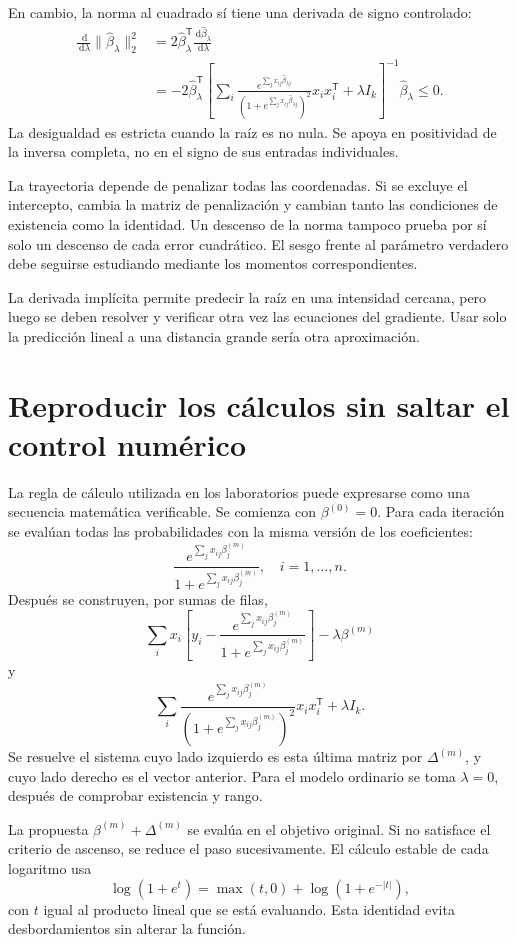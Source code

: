 \documentclass[11pt,a4paper]{article}
\newcommand{\T}{^{\mathsf T}}
\newcommand{\dd}{\,\mathrm d}
\begin{document}
En cambio, la norma al cuadrado sí tiene una
derivada de signo controlado:
\[
\begin{aligned}
\frac{\dd}{\dd\lambda}\|\widehat\beta_\lambda\|_2^2
&=2\widehat\beta_\lambda\T
\frac{\dd\widehat\beta_\lambda}{\dd\lambda}\\
&=-2\widehat\beta_\lambda\T
\left[
\sum_i\frac{e^{\sum_jx_{ij}\widehat\beta_{\lambda j}}}
{(1+e^{\sum_jx_{ij}\widehat\beta_{\lambda j}})^2}
x_ix_i\T+\lambda I_k
\right]^{-1}\widehat\beta_\lambda\le0.
\end{aligned}
\]
La desigualdad es estricta cuando la raíz es no nula.
Se apoya en positividad de la inversa completa,
no en el signo de sus entradas individuales.

La trayectoria depende de penalizar todas las coordenadas.
Si se excluye el intercepto, cambia la matriz de penalización
y cambian tanto las condiciones de existencia como la identidad.
Un descenso de la norma tampoco prueba por sí solo
un descenso de cada error cuadrático.
El sesgo frente al parámetro verdadero debe
seguirse estudiando mediante los momentos correspondientes.

La derivada implícita permite predecir la raíz en una
intensidad cercana, pero luego se deben resolver y
verificar otra vez las ecuaciones del gradiente.
Usar solo la predicción lineal a una distancia grande
sería otra aproximación.

\clearpage
\section{Reproducir los cálculos sin saltar el control numérico}\label{logit149}
La regla de cálculo utilizada en los laboratorios
puede expresarse como una secuencia matemática verificable.
Se comienza con \(\beta^{(0)}=0\).
Para cada iteración se evalúan todas las probabilidades
con la misma versión de los coeficientes:
\[
\frac{e^{\sum_jx_{ij}\beta_j^{(m)}}}
{1+e^{\sum_jx_{ij}\beta_j^{(m)}}},\quad i=1,\ldots,n.
\]
Después se construyen, por sumas de filas,
\[
\sum_i x_i\left[y_i-
\frac{e^{\sum_jx_{ij}\beta_j^{(m)}}}
{1+e^{\sum_jx_{ij}\beta_j^{(m)}}}\right]-\lambda\beta^{(m)}
\]
y
\[
\sum_i\frac{e^{\sum_jx_{ij}\beta_j^{(m)}}}
{(1+e^{\sum_jx_{ij}\beta_j^{(m)}})^2}x_ix_i\T+\lambda I_k.
\]
Se resuelve el sistema cuyo lado izquierdo es
esta última matriz por \(\Delta^{(m)}\),
y cuyo lado derecho es el vector anterior.
Para el modelo ordinario se toma \(\lambda=0\),
después de comprobar existencia y rango.

La propuesta \(\beta^{(m)}+\Delta^{(m)}\) se evalúa
en el objetivo original. Si no satisface el criterio
de ascenso, se reduce el paso sucesivamente.
El cálculo estable de cada logaritmo usa
\[
\log(1+e^t)=\max(t,0)+\log(1+e^{-|t|}),
\]
con \(t\) igual al producto lineal que se está evaluando.
Esta identidad evita desbordamientos sin alterar la función.
\end{document}
